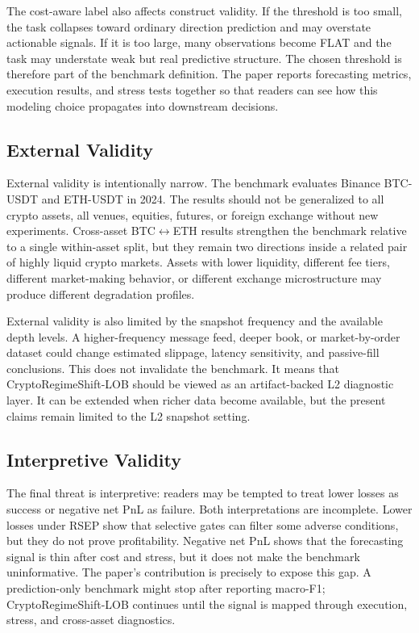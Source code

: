 \documentclass[conference]{IEEEtran}
\begin{document}
The cost-aware label also affects construct validity. If the threshold is too small, the task collapses toward ordinary direction prediction and may overstate actionable signals. If it is too large, many observations become FLAT and the task may understate weak but real predictive structure. The chosen threshold is therefore part of the benchmark definition. The paper reports forecasting metrics, execution results, and stress tests together so that readers can see how this modeling choice propagates into downstream decisions.

\subsection{External Validity}
External validity is intentionally narrow. The benchmark evaluates Binance BTC-USDT and ETH-USDT in 2024. The results should not be generalized to all crypto assets, all venues, equities, futures, or foreign exchange without new experiments. Cross-asset BTC$\leftrightarrow$ETH results strengthen the benchmark relative to a single within-asset split, but they remain two directions inside a related pair of highly liquid crypto markets. Assets with lower liquidity, different fee tiers, different market-making behavior, or different exchange microstructure may produce different degradation profiles.

External validity is also limited by the snapshot frequency and the available depth levels. A higher-frequency message feed, deeper book, or market-by-order dataset could change estimated slippage, latency sensitivity, and passive-fill conclusions. This does not invalidate the benchmark. It means that CryptoRegimeShift-LOB should be viewed as an artifact-backed L2 diagnostic layer. It can be extended when richer data become available, but the present claims remain limited to the L2 snapshot setting.

\subsection{Interpretive Validity}
The final threat is interpretive: readers may be tempted to treat lower losses as success or negative net PnL as failure. Both interpretations are incomplete. Lower losses under RSEP show that selective gates can filter some adverse conditions, but they do not prove profitability. Negative net PnL shows that the forecasting signal is thin after cost and stress, but it does not make the benchmark uninformative. The paper's contribution is precisely to expose this gap. A prediction-only benchmark might stop after reporting macro-F1; CryptoRegimeShift-LOB continues until the signal is mapped through execution, stress, and cross-asset diagnostics.
\end{document}

